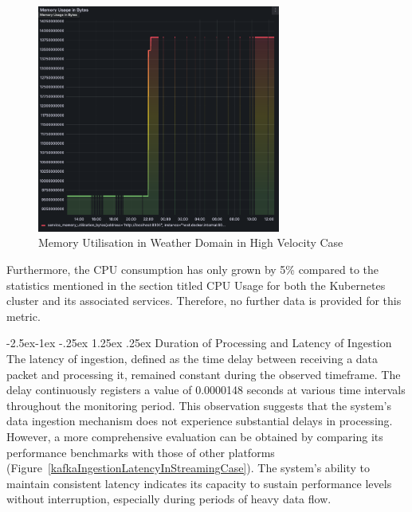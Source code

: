 \documentclass[review]{elsarticle}
\makeatletter
\renewcommand\paragraph{\@startsection{paragraph}{4}{\z@}%
            {-2.5ex\@plus -1ex \@minus -.25ex}%
            {1.25ex \@plus .25ex}%
            {\normalfont\normalsize\itshape}}
\makeatother
\begin{document}
\begin{figure}[ht]

  \centering

  \includegraphics[width=8cm]{images/memory-utilization-in-weather-domain-in-streaming-case.png}

  \caption{Memory Utilisation in Weather Domain in High Velocity Case}

  \label{memoryUtilizationInWeatherDomainInHighVelocityCase}

\end{figure}

Furthermore, the CPU consumption has only grown by 5\% compared to the statistics mentioned in the section titled CPU Usage for both the Kubernetes cluster and its associated services. Therefore, no further data is provided for this metric.

\paragraph{Duration of Processing and Latency of Ingestion} The latency of ingestion, defined as the time delay between receiving a data packet and processing it, remained constant during the observed timeframe. The delay continuously registers a value of 0.0000148 seconds at various time intervals throughout the monitoring period. This observation suggests that the system's data ingestion mechanism does not experience substantial delays in processing. However, a more comprehensive evaluation can be obtained by comparing its performance benchmarks with those of other platforms (Figure~\ref{kafkaIngestionLatencyInStreamingCase}). The system's ability to maintain consistent latency indicates its capacity to sustain performance levels without interruption, especially during periods of heavy data flow.
\end{document}
